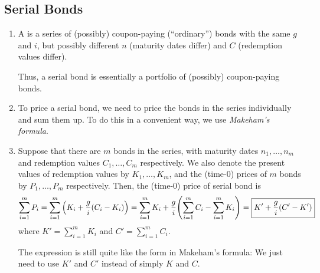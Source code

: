 \subsection{Serial Bonds}
\label{subsect:serial-bonds}
\begin{enumerate}
\item A  is a series of (possibly) coupon-paying
(``ordinary'') bonds with the same \(g\) and \(i\),  but possibly different
\(n\) (maturity dates differ) and \(C\) (redemption values differ).

\begin{note}
Thus, a serial bond is essentially a portfolio of (possibly) coupon-paying bonds.
\end{note}

\item \label{it:serial-bond-price-fmla}
To price a serial bond, we need to price the bonds in the series
individually and sum them up. To do this in a convenient way, we use
\emph{Makeham's formula}.

\item Suppose that there are \(m\) bonds in the series, with maturity dates
\(n_1,\dotsc,n_m\) and redemption values \(C_1,\dotsc,C_m\) respectively. We
also denote the present values of redemption values by \(K_1,\dotsc,K_m\), and
the (time-0) prices of \(m\) bonds by \(P_1,\dotsc,P_m\) respectively. Then,
the (time-0) price of serial bond is
\[
\sum_{i=1}^{m}P_i=\sum_{i=1}^{m}\qty(K_i+\frac{g}{i}(C_i-K_i))
=\sum_{i=1}^{m}K_i+\frac{g}{i}\qty(\sum_{i=1}^{m}C_i-\sum_{i=1}^{m}K_i)
=\boxed{K'+\frac{g}{i}(C'-K')}
\]
where \(\displaystyle K'=\sum_{i=1}^{m}K_i\) and \(\displaystyle
C'=\sum_{i=1}^{m}C_i\).

\begin{note}
The expression is still quite like the form in Makeham's formula: We just need
to use \(K'\) and \(C'\) instead of simply \(K\) and \(C\).
\end{note}
\end{enumerate}

